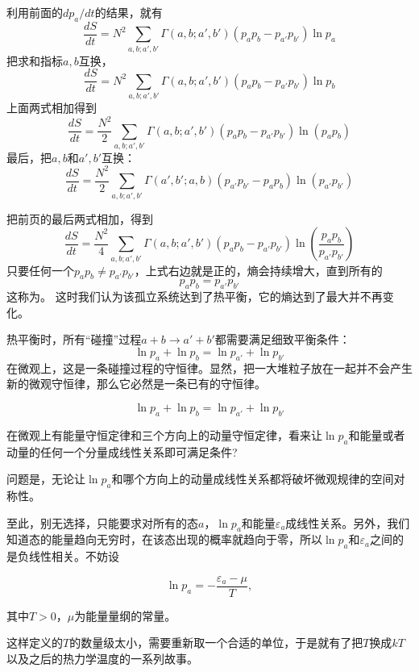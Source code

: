 \documentclass[CJK]{beamer}
\begin{document}
\begin{frame}
\bch
利用前面的$dp_a/dt$的结果，就有
$$\frac{d S}{dt} =  N^2 \sum_{a, b; a', b'}\Gamma(a, b; a', b') \left(p_ap_b - p_{a'}p_{b'}\right)\ln p_a    $$
把求和指标$a, b$互换，
$$\frac{d S}{dt} =  N^2 \sum_{a, b; a', b'}\Gamma(a, b; a', b') \left(p_ap_b - p_{a'}p_{b'}\right)\ln p_b    $$
上面两式相加得到
$$\frac{d S}{dt} =  \frac{N^2}{2} \sum_{a, b; a', b'}\Gamma(a, b; a', b') \left(p_ap_b - p_{a'}p_{b'}\right)\ln(p_ap_b)    $$
最后，把$a,b$和$a',b'$互换：
$$\frac{d S}{dt} =  \frac{N^2}{2} \sum_{a, b; a', b'}\Gamma(a', b'; a, b) \left(p_{a'}p_{b'} - p_ap_b\right)\ln(p_{a'}p_{b'})    $$
\ech
\end{frame}

\begin{frame}
\bch
把前页的最后两式相加，得到
$$\frac{d S}{dt} =  \frac{N^2}{4} \sum_{a, b; a', b'}\Gamma(a, b; a', b') \left(p_ap_b - p_{a'}p_{b'}\right)\ln(\frac{p_ap_b}{p_{a'}p_{b'}})    $$
只要任何一个$p_ap_b\ne p_{a'}p_{b'}$，上式右边就是正的，熵会持续增大，直到{\blue 所有的 
$$p_ap_b = p_{a'}p_{b'}$$}
这称为{。} 这时我们认为该孤立系统达到了热平衡，它的熵达到了最大并不再变化。


\ech
\end{frame}

\begin{frame}
\bchL
{
热平衡时，所有“碰撞”过程$a+b \rightarrow a'+b'$都需要满足细致平衡条件：
$$\ln p_a + \ln p_b = \ln p_{a'} + \ln p_{b'}$$
在微观上，这是一条碰撞过程的守恒律。显然，把一大堆粒子放在一起并不会产生新的微观守恒律，那么它必然是一条已有的守恒律。

}
\echL
\end{frame}

\begin{frame}
\bchL

$$\ln p_a + \ln p_b = \ln p_{a'} + \ln p_{b'}$$

\skipline

在微观上有能量守恒定律和三个方向上的动量守恒定律，看来让$\ln p_a$和能量或者动量的任何一个分量成线性关系即可满足条件?

\skipline

问题是，无论让$\ln p_a$和哪个方向上的动量成线性关系都将破坏{\blue 微观规律的空间对称性}。


\echL
\end{frame}

\begin{frame}
\bchL
至此，别无选择，只能要求对所有的态$a$，$\ln p_a$和能量$\varepsilon_a$成线性关系。另外，我们知道态的能量趋向无穷时，在该态出现的概率就趋向于零，所以$\ln p_a$和$\varepsilon_a$之间的是负线性相关。不妨设

$$\ln p_a = -\frac{\varepsilon_a - \mu}{T},$$

其中$T>0$，$\mu$为能量量纲的常量。

这样定义的$T$的数量级太小，需要重新取一个合适的单位，于是就有了把$T$换成$kT$以及之后的热力学温度的一系列故事。
\echL
\end{frame}
\end{document}
